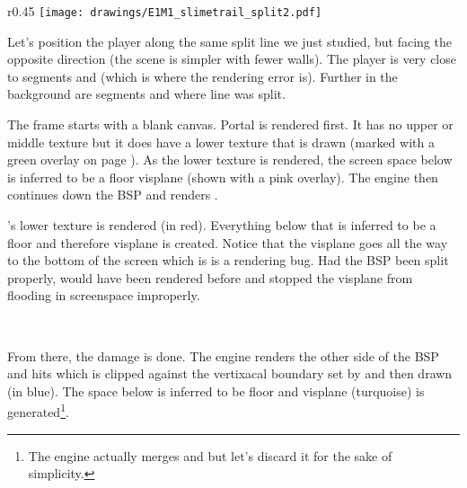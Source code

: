 \par
\begin{wrapfigure}[22]{r}{0.45\textwidth}
\centering
\texttt{[image: drawings/E1M1\_slimetrail\_split2.pdf]}
\end{wrapfigure}
Let's position the player along the same split line we just studied, but facing the opposite direction (the scene is simpler with fewer walls). The player is very close to segments  and  (which is where the rendering error is). Further in the background are segments  and  where line  was split.\\
\par
The frame starts with a blank canvas. Portal  is rendered first. It has no upper or middle texture but it does have a lower texture that is drawn (marked with a green overlay on page \pageref{leak_opposite_explained.png}). As the lower texture is rendered, the screen space below is inferred to be a floor visplane  (shown with a pink overlay). The engine then continues down the BSP and renders .\\
\par

 's lower texture is rendered (in red). Everything below that is inferred to be a floor and therefore visplane  is created. Notice that the visplane goes all the way to the bottom of the screen which is is a rendering bug. Had the BSP been split properly,  would have been rendered before  and stopped the visplane from flooding in screenspace improperly.\\
\par
 

\\
\label{leak_opposite_explained.png}
\par
From there, the damage is done. The engine renders the other side of the BSP and hits  which is clipped against the vertixacal boundary set by  and then drawn (in blue). The space below  is inferred to be floor and visplane  (turquoise) is generated\footnote{The engine actually merges  and  but let's discard it for the sake of simplicity.}.

